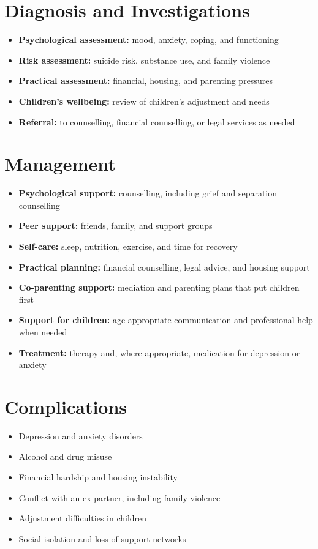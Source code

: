 \section*{Diagnosis and Investigations}
\begin{itemize}
    \item \textbf{Psychological assessment:} mood, anxiety, coping, and functioning
    \item \textbf{Risk assessment:} suicide risk, substance use, and family violence
    \item \textbf{Practical assessment:} financial, housing, and parenting pressures
    \item \textbf{Children's wellbeing:} review of children's adjustment and needs
    \item \textbf{Referral:} to counselling, financial counselling, or legal services as needed
\end{itemize}

\section*{Management}
\begin{itemize}
    \item \textbf{Psychological support:} counselling, including grief and separation counselling
    \item \textbf{Peer support:} friends, family, and support groups
    \item \textbf{Self-care:} sleep, nutrition, exercise, and time for recovery
    \item \textbf{Practical planning:} financial counselling, legal advice, and housing support
    \item \textbf{Co-parenting support:} mediation and parenting plans that put children first
    \item \textbf{Support for children:} age-appropriate communication and professional help when needed
    \item \textbf{Treatment:} therapy and, where appropriate, medication for depression or anxiety
\end{itemize}

\section*{Complications}
\begin{itemize}
    \item Depression and anxiety disorders
    \item Alcohol and drug misuse
    \item Financial hardship and housing instability
    \item Conflict with an ex-partner, including family violence
    \item Adjustment difficulties in children
    \item Social isolation and loss of support networks
\end{itemize}

